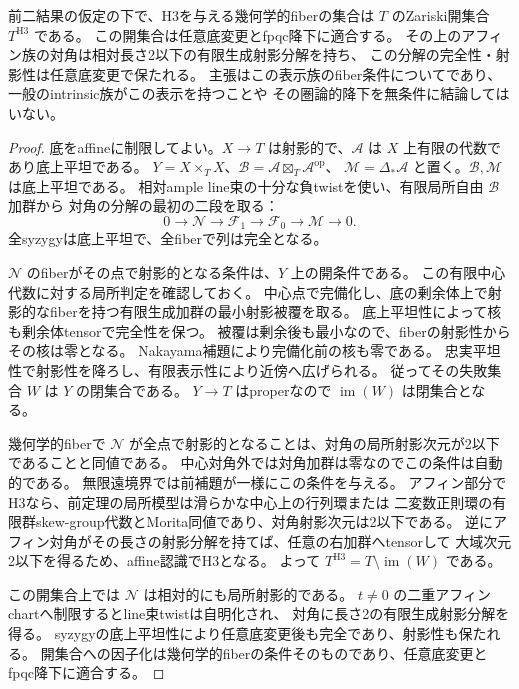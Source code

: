 \begin{theorem}
\label{thm:finite-order-relative-H3-open}
前二結果の仮定の下で、H3を与える幾何学的fiberの集合は $T$ のZariski開集合 $T^{\mathrm{H3}}$ である。
この開集合は任意底変更とfpqc降下に適合する。
その上のアフィン族の対角は相対長さ2以下の有限生成射影分解を持ち、
この分解の完全性・射影性は任意底変更で保たれる。
主張はこの表示族のfiber条件についてであり、一般のintrinsic族がこの表示を持つことや
その圏論的降下を無条件に結論してはいない。
\end{theorem}
\begin{proof}
底をaffineに制限してよい。$X\to T$ は射影的で、$\mathcal A$ は $X$ 上有限の代数であり底上平坦である。
$Y=X\times_T X$、$\mathcal B=\mathcal A\boxtimes_T\mathcal A^{\mathrm{op}}$、
$\mathcal M=\Delta_*\mathcal A$ と置く。$\mathcal B,\mathcal M$ は底上平坦である。
相対ample line束の十分な負twistを使い、有限局所自由 $\mathcal B$ 加群から
対角の分解の最初の二段を取る：
\[
 0\longrightarrow\mathcal N\longrightarrow\mathcal F_1
 \longrightarrow\mathcal F_0\longrightarrow\mathcal M\longrightarrow0.
\]
全syzygyは底上平坦で、全fiberで列は完全となる。

$\mathcal N$ のfiberがその点で射影的となる条件は、$Y$ 上の開条件である。
この有限中心代数に対する局所判定を確認しておく。
中心点で完備化し、底の剰余体上で射影的なfiberを持つ有限生成加群の最小射影被覆を取る。
底上平坦性によって核も剰余体tensorで完全性を保つ。
被覆は剰余後も最小なので、fiberの射影性からその核は零となる。
Nakayama補題により完備化前の核も零である。
忠実平坦性で射影性を降ろし、有限表示性により近傍へ広げられる。
従ってその失敗集合 $W$ は $Y$ の閉集合である。
$Y\to T$ はproperなので $\operatorname{im}(W)$ は閉集合となる。

幾何学的fiberで $\mathcal N$ が全点で射影的となることは、対角の局所射影次元が2以下であることと同値である。
中心対角外では対角加群は零なのでこの条件は自動的である。
無限遠境界では前補題が一様にこの条件を与える。
アフィン部分でH3なら、前定理の局所模型は滑らかな中心上の行列環または
二変数正則環の有限群skew-group代数とMorita同値であり、対角射影次元は2以下である。
逆にアフィン対角がその長さの射影分解を持てば、任意の右加群へtensorして
大域次元2以下を得るため、affine認識でH3となる。
よって $T^{\mathrm{H3}}=T\setminus\operatorname{im}(W)$ である。

この開集合上では $\mathcal N$ は相対的にも局所射影的である。
$t\ne0$ の二重アフィンchartへ制限するとline束twistは自明化され、
対角に長さ2の有限生成射影分解を得る。
syzygyの底上平坦性により任意底変更後も完全であり、射影性も保たれる。
開集合への因子化は幾何学的fiberの条件そのものであり、任意底変更とfpqc降下に適合する。
\end{proof}

